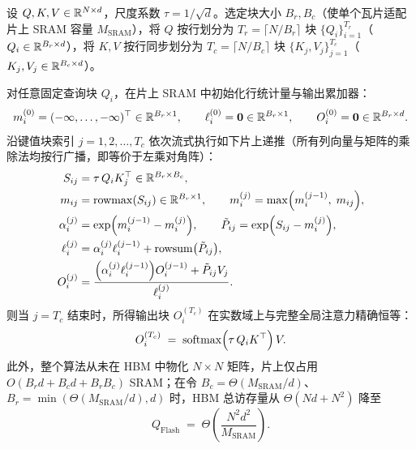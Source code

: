 \begin{thmBox}
\begin{theorem}
\label{thm:online-softmax-tiling}
设 $Q, K, V \in \mathbb{R}^{N \times d}$，尺度系数 $\tau = 1/\sqrt{d}$。选定块大小 $B_r, B_c$（使单个瓦片适配片上 SRAM 容量 $M_{\mathrm{SRAM}}$），将 $Q$ 按行划分为 $T_r = \lceil N / B_r \rceil$ 块 $\{Q_i\}_{i=1}^{T_r}$（$Q_i \in \mathbb{R}^{B_r \times d}$），将 $K, V$ 按行同步划分为 $T_c = \lceil N / B_c \rceil$ 块 $\{K_j, V_j\}_{j=1}^{T_c}$（$K_j, V_j \in \mathbb{R}^{B_c \times d}$）。

对任意固定查询块 $Q_i$，在片上 SRAM 中初始化行统计量与输出累加器：
\[
  m_i^{(0)} = (-\infty, \dots, -\infty)^\top \in \mathbb{R}^{B_r \times 1}, \qquad
  \ell_i^{(0)} = \mathbf{0} \in \mathbb{R}^{B_r \times 1}, \qquad
  O_i^{(0)} = \mathbf{0} \in \mathbb{R}^{B_r \times d}.
\]
沿键值块索引 $j = 1, 2, \dots, T_c$ 依次流式执行如下片上递推（所有列向量与矩阵的乘除法均按行广播，即等价于左乘对角阵）：
\begin{align}
  S_{ij} &= \tau\, Q_i K_j^\top \in \mathbb{R}^{B_r \times B_c}, \label{eq:flash-sij}\\
  m_{ij} &= \operatorname{rowmax}(S_{ij}) \in \mathbb{R}^{B_r \times 1}, \qquad
  m_i^{(j)} = \max\!\Big(m_i^{(j-1)},\; m_{ij}\Big), \label{eq:flash-m}\\
  \alpha_i^{(j)} &= \exp\!\Big(m_i^{(j-1)} - m_i^{(j)}\Big), \qquad
  \tilde{P}_{ij} = \exp\!\Big(S_{ij} - m_i^{(j)}\Big), \label{eq:flash-p}\\
  \ell_i^{(j)} &= \alpha_i^{(j)} \ell_i^{(j-1)} + \operatorname{rowsum}\!\big(\tilde{P}_{ij}\big), \label{eq:flash-l}\\
  O_i^{(j)} &= \frac{\Big(\alpha_i^{(j)} \ell_i^{(j-1)}\Big) O_i^{(j-1)} + \tilde{P}_{ij} V_j}{\ell_i^{(j)}}. \label{eq:flash-o}
\end{align}
则当 $j = T_c$ 结束时，所得输出块 $O_i^{(T_c)}$ 在实数域上与完整全局注意力精确恒等：
\begin{equation}
  O_i^{(T_c)} \;=\; \operatorname{softmax}\!\Big(\tau\, Q_i K^\top\Big)\, V.
  \label{eq:flash-exact}
\end{equation}
此外，整个算法从未在 HBM 中物化 $N \times N$ 矩阵，片上仅占用 $O(B_r d + B_c d + B_r B_c)$ SRAM；在令 $B_c = \Theta(M_{\mathrm{SRAM}} / d)$、$B_r = \min(\Theta(M_{\mathrm{SRAM}} / d), d)$ 时，HBM 总访存量从 $\Theta(Nd + N^2)$ 降至
\begin{equation}
  Q_{\mathrm{Flash}} \;=\; \Theta\!\left(\frac{N^2 d^2}{M_{\mathrm{SRAM}}}\right).
  \label{eq:flash-io}
\end{equation}
\end{theorem}
\end{thmBox}

